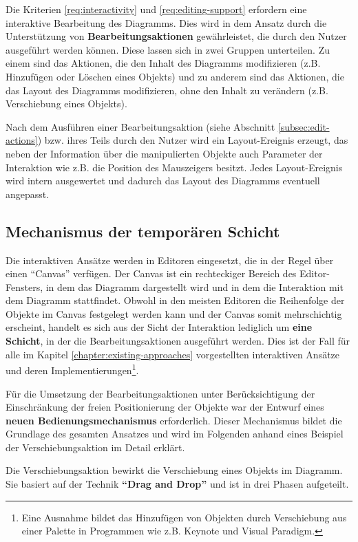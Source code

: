 Die Kriterien \ref{req:interactivity} und \ref{req:editing-support} erfordern eine interaktive Bearbeitung des Diagramms. Dies wird in dem Ansatz durch die Unterstützung von \textbf{Bearbeitungsaktionen} gewährleistet, die durch den Nutzer ausgeführt werden können. Diese lassen sich in zwei Gruppen unterteilen. Zu einem sind das Aktionen, die den Inhalt des Diagramms modifizieren (z.B. Hinzufügen oder Löschen eines Objekts) und zu anderem sind das Aktionen, die das Layout des Diagramms modifizieren, ohne den Inhalt zu verändern (z.B. Verschiebung eines Objekts).

Nach dem Ausführen einer Bearbeitungsaktion (siehe Abschnitt \ref{subsec:edit-actions}) bzw. ihres Teils durch den Nutzer wird ein Layout-Ereignis erzeugt, das neben der Information über die manipulierten Objekte auch Parameter der Interaktion wie z.B. die Position des Mauszeigers besitzt. Jedes Layout-Ereignis wird intern ausgewertet und dadurch das Layout des Diagramms eventuell angepasst.

\subsection{Mechanismus der temporären Schicht}

Die interaktiven Ansätze werden in Editoren eingesetzt, die in der Regel über einen \enquote{Canvas} verfügen. Der Canvas ist ein rechteckiger Bereich des Editor-Fensters, in dem das Diagramm dargestellt wird und in dem die Interaktion mit dem Diagramm stattfindet. Obwohl in den meisten Editoren die Reihenfolge der Objekte im Canvas festgelegt werden kann und der Canvas somit mehrschichtig erscheint, handelt es sich aus der Sicht der Interaktion lediglich um \textbf{eine Schicht}, in der die Bearbeitungsaktionen ausgeführt werden. Dies ist der Fall für alle im Kapitel \ref{chapter:existing-approaches} vorgestellten interaktiven Ansätze und deren Implementierungen\footnote{Eine Ausnahme bildet das Hinzufügen von Objekten durch Verschiebung aus einer Palette in Programmen wie z.B. Keynote und Visual Paradigm.}.

Für die Umsetzung der Bearbeitungsaktionen unter Berücksichtigung der Einschränkung der freien Positionierung der Objekte war der Entwurf eines \textbf{neuen Bedienungsmechanismus} erforderlich. Dieser Mechanismus bildet die Grundlage des gesamten Ansatzes und wird im Folgenden anhand eines Beispiel der Verschiebungsaktion im Detail erklärt.

Die Verschiebungsaktion bewirkt die Verschiebung eines Objekts im Diagramm. Sie basiert auf der Technik \textbf{\enquote{Drag and Drop}} und ist in drei Phasen aufgeteilt.

